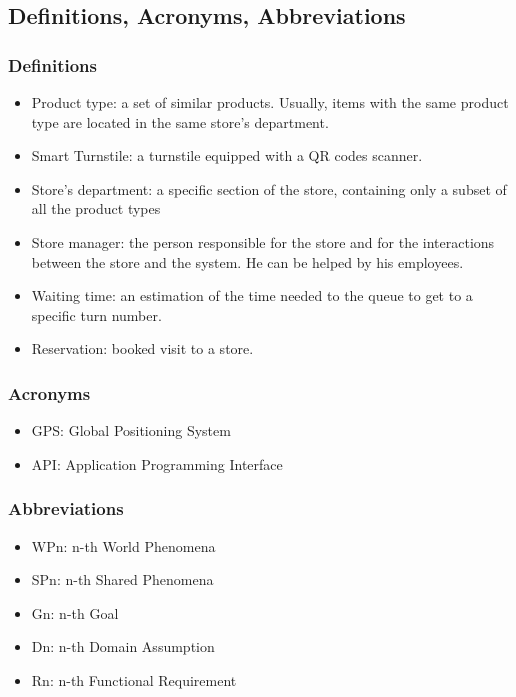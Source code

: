 \documentclass{article}
\begin{document}
\subsection{Definitions, Acronyms, Abbreviations}
\subsubsection{Definitions}
\begin{itemize}
\item Product type: a set of similar products. Usually, items with the same product type are located in the same store's department.
\item Smart Turnstile: a turnstile equipped with a QR codes scanner.
\item Store's department: a specific section of the store, containing only a subset of all the product types
\item Store manager: the person responsible for the store and for the interactions between the store and the system. He can be helped by his employees.
\item Waiting time: an estimation of the time needed to the queue to get to a specific turn number.
\item Reservation: booked visit to a store.
\end{itemize}
\subsubsection{Acronyms}
\begin{itemize}
\item GPS: Global Positioning System
\item API: Application Programming Interface
\end{itemize}
\subsubsection{Abbreviations}
\begin{itemize}
\item WPn: n-th World Phenomena
\item SPn: n-th Shared Phenomena
\item Gn: n-th Goal
\item Dn: n-th Domain Assumption
\item Rn: n-th Functional Requirement
\end{itemize}
\end{document}
